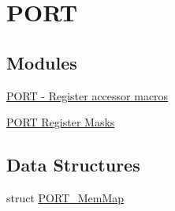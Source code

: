 \hypertarget{group___p_o_r_t___peripheral}{}\section{P\+O\+R\+T}
\label{group___p_o_r_t___peripheral}
\subsection*{Modules}
\begin{DoxyCompactItemize}
\item 
\hyperlink{group___p_o_r_t___register___accessor___macros}{P\+O\+R\+T -\/ Register accessor macros}
\item 
\hyperlink{group___p_o_r_t___register___masks}{P\+O\+R\+T Register Masks}
\end{DoxyCompactItemize}
\subsection*{Data Structures}
\begin{DoxyCompactItemize}
\item 
struct \hyperlink{struct_p_o_r_t___mem_map}{P\+O\+R\+T\+\_\+\+Mem\+Map}
\end{DoxyCompactItemize}
